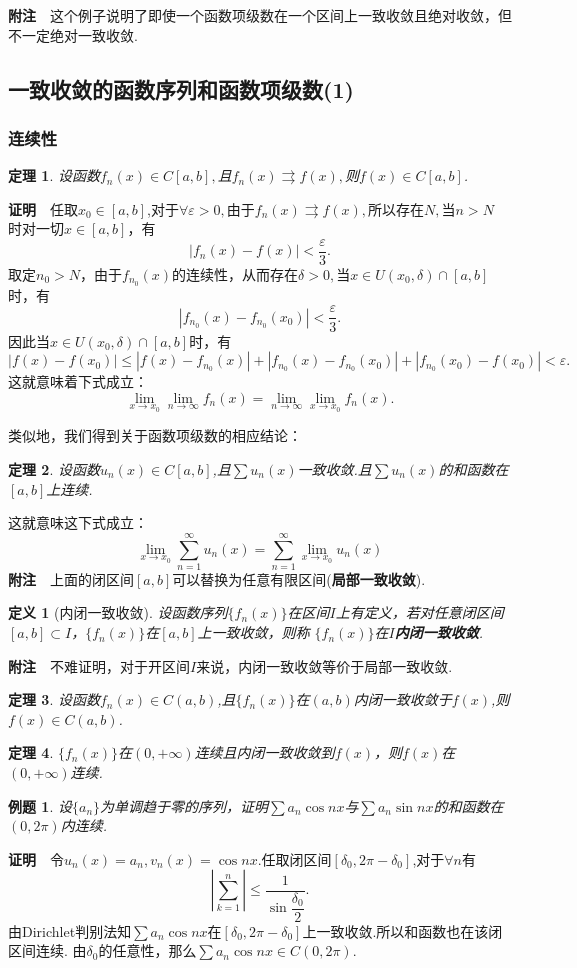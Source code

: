 \documentclass[UTF8]{article}
\newcommand{\zm}{\textbf{证明}$\quad$}
\newcommand{\fz}{\textbf{附注}$\quad$}
\newtheorem{thm}{\hspace{2em}定理}[section]
\newtheorem{dfn}{\hspace{2em}定义}[section]
\newtheorem{exa}{\hspace{2em}例题}[section]
\begin{document}
\fz 这个例子说明了即使一个函数项级数在一个区间上一致收敛且绝对收敛，但不一定绝对一致收敛.
\subsection{一致收敛的函数序列和函数项级数(1)}
\subsubsection{连续性}
\begin{thm}
  设函数$f_n(x)\in C[a,b],$且$f_n(x)\rightrightarrows f(x),$则$f(x)\in C[a,b]$.
\end{thm}
\zm 任取$x_0\in[a,b]$,对于$\forall\varepsilon>0,$由于$f_n(x)\rightrightarrows f(x),$所以存在$N,$当$n>N$
时对一切$x\in [a,b]$，有
$$|f_n(x)-f(x)|<\frac{\varepsilon}{3}.$$
取定$n_0>N$，由于$f_{n_0}(x)$的连续性，从而存在$\delta>0,$当$x\in U(x_0,\delta)\cap[a,b]$时，有
$$|f_{n_0}(x)-f_{n_0}(x_0)|<\frac{\varepsilon}{3}.$$
因此当$x\in U(x_0,\delta)\cap[a,b]$时，有
$$|f(x)-f(x_0)|\le|f(x)-f_{n_0}(x)|+|f_{n_0}(x)-f_{n_0}(x_0)|+|f_{n_0}(x_0)-f(x_0)|<\varepsilon.$$
这就意味着下式成立：
$$\lim_{x\to x_0}\lim_{n\to\infty}f_n(x)=\lim_{n\to\infty}\lim_{x\to x_0}f_n(x).$$

类似地，我们得到关于函数项级数的相应结论：
\begin{thm}
  设函数$u_n(x)\in C[a,b]$,且$\sum u_n(x)$一致收敛.且$\sum u_n(x)$的和函数在$[a,b]$上连续.
\end{thm}
这就意味这下式成立：
$$\lim_{x\to x_0}\sum_{n=1}^\infty u_n(x)=\sum_{n=1}^\infty \lim_{x\to x_0}u_n(x)$$
\fz 上面的闭区间$[a,b]$可以替换为任意有限区间(\textbf{局部一致收敛}).
\begin{dfn}[内闭一致收敛]
  设函数序列$\{f_n(x)\}$在区间$I$上有定义，若对任意闭区间$[a,b]\subset I$，$\{f_n(x)\}$在$[a,b]$上一致收敛，则称
  $\{f_n(x)\}$在$I$\textbf{内闭一致收敛}.
\end{dfn}
\fz 不难证明，对于开区间$I$来说，内闭一致收敛等价于局部一致收敛.
\begin{thm}
  设函数$f_n(x)\in C(a,b)$,且$\{f_n(x)\}$在$(a,b)$内闭一致收敛于$f(x)$,则$f(x)\in C(a,b)$.
\end{thm}
\begin{thm}
  $\{f_n(x)\}$在$(0,+\infty)$连续且内闭一致收敛到$f(x)$，则$f(x)$在$(0,+\infty)$连续.
\end{thm}
\begin{exa}
  设$\{a_n\}$为单调趋于零的序列，证明$\sum a_n\cos nx$与$\sum a_n\sin nx$的和函数在$(0,2\pi)$内连续.
\end{exa}
\zm 令$u_n(x)=a_n,v_n(x)=\cos nx$.任取闭区间$[\delta_0,2\pi-\delta_0]$,对于$\forall n$有
$$\left|\sum_{k=1}^n\right|\le\frac{1}{\sin\dfrac{\delta_0}{2}}.$$
由Dirichlet判别法知$\sum a_n\cos nx$在$[\delta_0,2\pi-\delta_0]$上一致收敛.所以和函数也在该闭区间连续.
由$\delta_0$的任意性，那么$\sum a_n\cos nx\in C(0,2\pi).$
\end{document}
